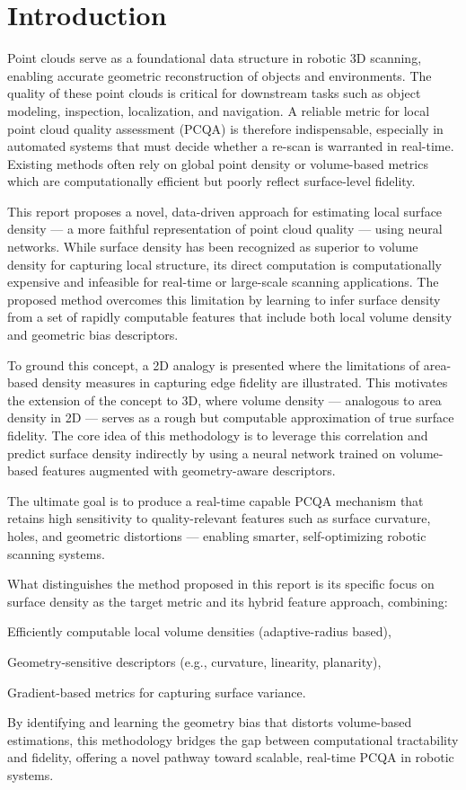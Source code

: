 \section{Introduction}
Point clouds serve as a foundational data structure in robotic 3D scanning, enabling accurate geometric reconstruction of objects and environments. The quality of these point clouds is critical for downstream tasks such as object modeling, inspection, localization, and navigation. A reliable metric for local point cloud quality assessment (PCQA) is therefore indispensable, especially in automated systems that must decide whether a re-scan is warranted in real-time. Existing methods often rely on global point density or volume-based metrics which are computationally efficient but poorly reflect surface-level fidelity.

This report proposes a novel, data-driven approach for estimating local surface density — a more faithful representation of point cloud quality — using neural networks. While surface density has been recognized as superior to volume density for capturing local structure, its direct computation is computationally expensive and infeasible for real-time or large-scale scanning applications. The proposed method overcomes this limitation by learning to infer surface density from a set of rapidly computable features that include both local volume density and geometric bias descriptors.

To ground this concept, a 2D analogy is presented where the limitations of area-based density measures in capturing edge fidelity are illustrated. This motivates the extension of the concept to 3D, where volume density — analogous to area density in 2D — serves as a rough but computable approximation of true surface fidelity. The core idea of this methodology is to leverage this correlation and predict surface density indirectly by using a neural network trained on volume-based features augmented with geometry-aware descriptors.

The ultimate goal is to produce a real-time capable PCQA mechanism that retains high sensitivity to quality-relevant features such as surface curvature, holes, and geometric distortions — enabling smarter, self-optimizing robotic scanning systems.

What distinguishes the method proposed in this report is its specific focus on surface density as the target metric and its hybrid feature approach, combining:

Efficiently computable local volume densities (adaptive-radius based),

Geometry-sensitive descriptors (e.g., curvature, linearity, planarity),

Gradient-based metrics for capturing surface variance.

By identifying and learning the geometry bias that distorts volume-based estimations, this methodology bridges the gap between computational tractability and fidelity, offering a novel pathway toward scalable, real-time PCQA in robotic systems.